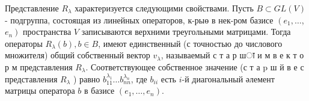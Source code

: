 \documentclass[10pt]{article}
\begin{document}
Представление $R_{\lambda}$ характеризуется следующими свойствами. Пусть $B \subset G L(V)$ - подгруппа, состоящая из линейных операторов, к-рыө в нек-ром базисе $\left(e_{1}, \ldots\right.$, $\left.e_{n}\right)$ пространства $V$ записываются верхними треугольными матрицами. Тогда операторы $R_{\lambda}(b), b \in B$, имеют единственный (с точностью до числового множителя) общий собственный вектор $v_{\lambda}$, называемый с т а р шा и м в е к т о р м представления $R_{\lambda}$. Соответствующее собственное значение (с т а $\mathrm{p}$ ш й в е с представления $R_{\lambda}$ ) равно $b_{11}^{\lambda_{1}} \ldots b_{n n}^{\lambda_{n}}$, где $b_{i i}$ есть $i$-й диагональный әлемент матрицы оператора $b$ в базисе $\left(e_{1}, \ldots, e_{n}\right)$.
\end{document}
